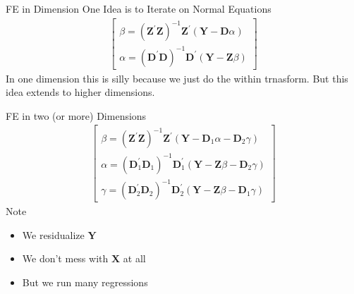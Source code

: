 \documentclass[aspectratio=169]{beamer}
\begin{document}
\begin{frame}{FE in Dimension One}
Idea is to \alert{Iterate on Normal Equations}
\begin{align*}
\left[ \begin{array} { c } { \beta = \left( \mathbf { Z } ^ { \prime } \mathbf { Z } \right) ^ { - 1 } \mathbf { Z } ^ { \prime } ( \mathbf { Y } - \mathbf { D } \alpha ) } \\ { \alpha = \left( \mathbf { D } ^ { \prime } \mathbf { D } \right) ^ { - 1 } \mathbf { D } ^ { \prime } ( \mathbf { Y } - \mathbf { Z } \beta ) } \end{array} \right]
\end{align*}
In one dimension this is silly because we just do the \alert{within trnasform}. But this idea extends to higher dimensions.
\end{frame}

\begin{frame}{FE in two (or more) Dimensions}
\begin{align*}
\left[ \begin{array} { c } { \beta = \left( \mathbf { Z } ^ { \prime } \mathbf { Z } \right) ^ { - 1 } \mathbf { Z } ^ { \prime } \left( \mathbf { Y } - \mathbf { D } _ { 1 } \alpha - \mathbf { D } _ { 2 } \gamma \right) } \\ { \alpha = \left( \mathbf { D } _ { 1 } ^ { \prime } \mathbf { D } _ { 1 } \right) ^ { - 1 } \mathbf { D } _ { 1 } ^ { \prime } \left( \mathbf { Y } - \mathbf { Z } \beta - \mathbf { D } _ { 2 } \gamma \right) } \\ { \gamma = \left( \mathbf { D } _ { 2 } ^ { \prime } \mathbf { D } _ { 2 } \right) ^ { - 1 } \mathbf { D } _ { 2 } ^ { \prime } \left( \mathbf { Y } - \mathbf { Z } \beta - \mathbf { D } _ { 1 } \gamma \right) } \end{array} \right]
\end{align*}
Note
\begin{itemize}
\item We residualize $\mathbf{Y}$
\item We don't mess with $\mathbf{X}$ at all
\item But we run many regressions
\end{itemize}
\end{frame}
\end{document}
